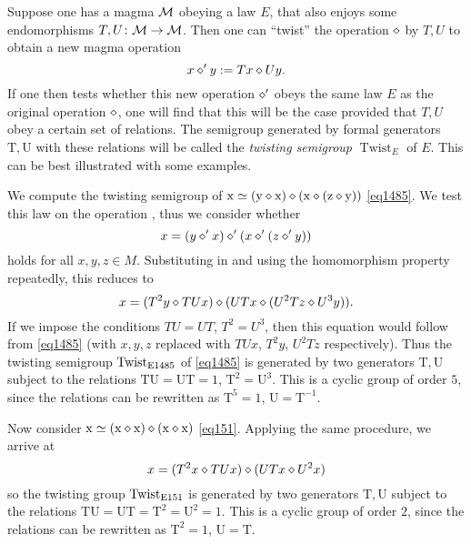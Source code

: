 Suppose one has a magma ${\mathcal{M}}$ obeying a law $E$, that also enjoys some endomorphisms $T, U \colon {\mathcal{M}} \to {\mathcal{M}}$.  Then one can ``twist'' the operation $\diamond$ by $T,U$ to obtain a new magma operation
\begin{equation}\label{twist} x \diamond' y := Tx \diamond Uy.
\end{equation}
If one then tests whether this new operation $\diamond'$ obeys the same law $E$ as the original operation $\diamond$, one will find that this will be the case provided that $T,U$ obey a certain set of relations.  The semigroup generated by formal generators $\mathrm{T}, \mathrm{U}$ with these relations will be called the \emph{twisting semigroup} $\operatorname{Twist}_E$ of $E$.  This can be best illustrated with some examples.

\begin{example}  We compute the twisting semigroup of $\mathrm{x} \simeq (\mathrm{y} \diamond \mathrm{x}) \diamond (\mathrm{x} \diamond (\mathrm{z} \diamond \mathrm{y}))$ \eqref{eq1485}.  We test this law on the operation , thus we consider whether
$$x = (y \diamond' x) \diamond' (x \diamond' (z \diamond' y))$$
holds for all $x,y,z \in M$.  Substituting in  and using the homomorphism property repeatedly, this reduces to
$$x = (T^2y \diamond TUx) \diamond (UTx \diamond (U^2T z \diamond U^3y)).$$
If we impose the conditions $TU=UT$, $T^2 = U^3$, then this equation would follow from \eqref{eq1485} (with $x,y,z$ replaced with $TUx$, $T^2 y$, $U^2 Tz$ respectively).  Thus the twisting semigroup $\operatorname{Twist}_{\mathrm{E}1485}$ of \eqref{eq1485} is generated by two generators $\mathrm{T}, \mathrm{U}$ subject to the relations $\mathrm{T} \mathrm{U}=\mathrm{U} \mathrm{T} = 1$, $\mathrm{T}^2 = \mathrm{U}^3$.  This is a cyclic group of order $5$, since the relations can be rewritten as $\mathrm{T}^5 = 1$, $\mathrm{U} = \mathrm{T}^{-1}$.

Now consider $\mathrm{x} \simeq (\mathrm{x} \diamond \mathrm{x}) \diamond (\mathrm{x} \diamond \mathrm{x})$ \eqref{eq151}.  Applying the same procedure, we arrive at
$$x = (T^2 x \diamond TUx) \diamond (UT x \diamond U^2 x)$$
so the twisting group $\operatorname{Twist}_{\mathrm{E}151}$ is generated by two generators $\mathrm{T}, \mathrm{U}$ subject to the relations $\mathrm{T} \mathrm{U}=\mathrm{U} \mathrm{T} = \mathrm{T}^2 = \mathrm{U}^2 = 1$.  This is a cyclic group of order $2$, since the relations can be rewritten as $\mathrm{T}^2 = 1$, $\mathrm{U} = \mathrm{T}$.
\end{example}

